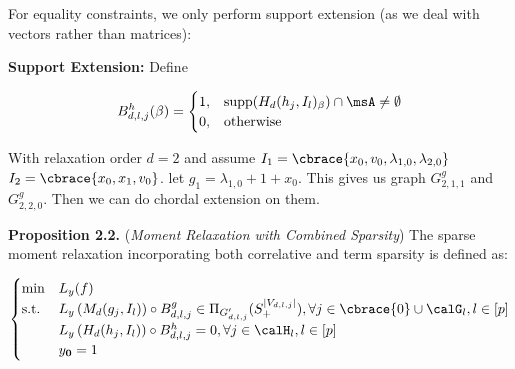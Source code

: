 For equality constraints, we only perform support extension (as we deal with vectors rather than matrices):

\textbf{Support Extension: } Define

\begin{align}
	B_{d,l,j}^h(\beta) = \begin{cases}
		1, & \text{supp}(H_d(h_j, I_l)_{\beta}) \cap \msA \ne \emptyset\\
		0, & \text{otherwise}
	\end{cases}
\end{align}

\begin{example}

	With relaxation order $d = 2$ and assume $I_1 = \cbrace{x_0, v_0, \lambda_{1,0}, \lambda_{2,0}}$ $I_2 = \cbrace{x_0, x_1, v_0}$. let $g_1 = \lambda_{1,0} + 1 + x_0$. This gives us graph $G_{2,1,1}^g$ and $G_{2,2,0}^g$. Then we can do chordal extension on them. 
\end{example}


\textbf{Proposition 2.2.} (\emph{Moment Relaxation with Combined Sparsity})
The sparse moment relaxation incorporating both correlative and term sparsity is defined as:	

\begin{align}
	\begin{cases}
		\min & L_y(f) \\
		\text{s.t.} & L_y\left( M_d(g_j, I_l) \right) \circ B_{d,l,j}^g \in \Pi_{G'_{d,l,j}}(S^{|V_{d,l,j}|}_{+}), \forall j\in \cbrace{0} \cup \calG_l, l\in [p]\\
		& L_y\left( H_d(h_j, I_l) \right) \circ B_{d,l,j}^h = 0, \forall j\in \calH_l, l\in [p]\\
		& y_{\mathbf{0}} = 1 
	\end{cases}
\end{align}

